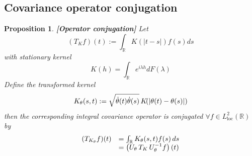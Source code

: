 \documentclass{article}
\newcommand{\assign}{:=}
\newcommand{\tmop}[1]{\ensuremath{\operatorname{#1}}}
\newcommand{\tmstrong}[1]{\textbf{#1}}
\newtheorem{proposition}{Proposition}
{\theorembodyfont{\rmfamily}\newtheorem{remark}{Remark}}
\begin{document}
\subsection{Covariance operator conjugation}

\begin{proposition}
  {\tmstrong{[Operator conjugation]\label{prop:conjugation}}} Let
  \begin{equation}
    (T_K f) (t) \assign \int_{\mathbb{R}} K (|t - s|) f (s) ds
  \end{equation}
  with stationary kernel
  \begin{equation}
    K (h) = \int_{\mathbb{R}} e^{i \lambda h} dF (\lambda)
  \end{equation}
  Define the transformed kernel
  \begin{equation}
    K_{\theta} (s, t) \assign \sqrt{\dot{\theta} (t)  \dot{\theta} (s)} 
    \hspace{0.17em} K \hspace{-0.17em} (| \theta (t) - \theta (s) |)
  \end{equation}
  then the corresponding integral covariance operator is conjugated $\forall f
  \in L^2_{\tmop{loc}} (\mathbb{R})$ by
  \begin{equation}
    \begin{array}{ll}
      (T_{K_{\theta}} f) (t) & = \int_{\mathbb{R}} K_{\theta} (s, t) f (s)
      \hspace{0.17em} ds\\
      & = \left( U_{\theta}  \hspace{0.17em} T_K  \hspace{0.17em}
      U_{\theta}^{- 1} f \right) (t)
    \end{array}
  \end{equation}
\end{proposition}
\end{document}

